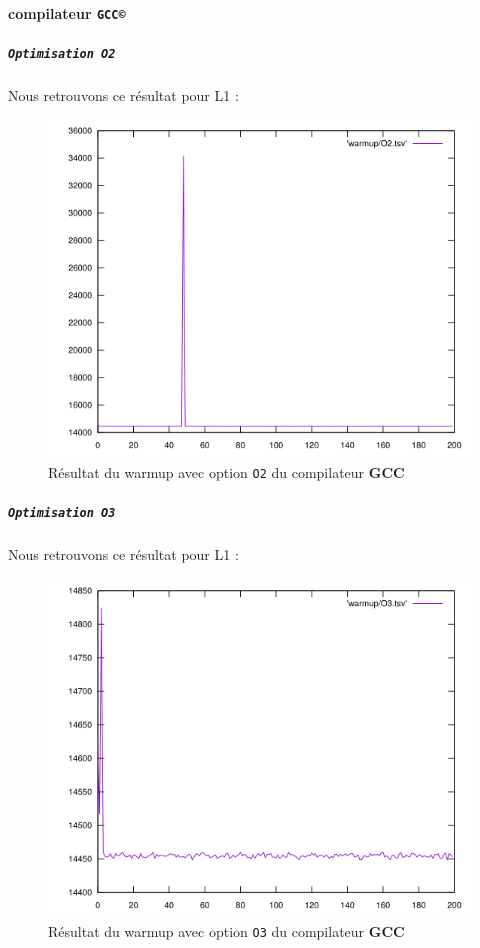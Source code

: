 \documentclass{report}
\begin{document}
      \paragraph{compilateur \texttt{GCC©}}
        \subparagraph{ \texttt{Optimisation O2}}
      Nous retrouvons ce résultat pour L1 :
      \begin{figure}[ht!]
        \centering
        \includegraphics[scale=0.45]{resources/warmup/L1/O2.png}
        \caption{Résultat du warmup avec option \texttt{O2} du compilateur \textbf{GCC}}
      \end{figure}
      \newpage
      \subparagraph{ \texttt{Optimisation O3}}
    Nous retrouvons ce résultat pour L1 :
    \begin{figure}[ht!]
      \centering
      \includegraphics[scale=0.45]{resources/warmup/L1/O3.png}
      \caption{Résultat du warmup avec option \texttt{O3} du compilateur \textbf{GCC}}
    \end{figure}
\end{document}
